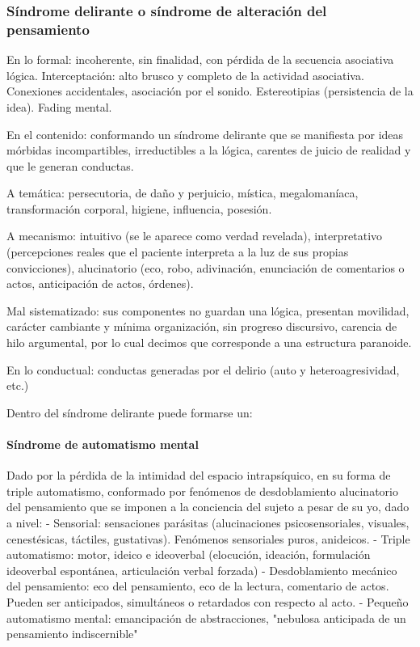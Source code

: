 \subsubsection*{Síndrome delirante o síndrome de alteración del pensamiento}
En lo formal: incoherente, sin finalidad, con pérdida de la secuencia asociativa lógica. Interceptación: alto brusco y completo de la actividad asociativa. Conexiones accidentales, asociación por el sonido. Estereotipias (persistencia de la idea). Fading mental.

En el contenido: conformando un síndrome delirante que se manifiesta por ideas mórbidas incompartibles, irreductibles a la lógica, carentes de juicio de realidad y que le generan conductas.

A temática: persecutoria, de daño y perjuicio, mística, megalomaníaca, transformación corporal, higiene, influencia, posesión.

A mecanismo: intuitivo (se le aparece como verdad revelada), interpretativo (percepciones reales que el paciente interpreta a la luz de sus propias convicciones), alucinatorio (eco, robo, adivinación, enunciación de comentarios o actos, anticipación de actos, órdenes).

Mal sistematizado: sus componentes no guardan una lógica, presentan movilidad, carácter cambiante y mínima organización, sin progreso discursivo, carencia de hilo argumental, por lo cual decimos que corresponde a una estructura paranoide.

En lo conductual: conductas generadas por el delirio (auto y heteroagresividad, etc.)

Dentro del síndrome delirante puede formarse un:
\paragraph{Síndrome de automatismo mental}
Dado por la pérdida de la intimidad del espacio intrapsíquico, en su forma de triple automatismo, conformado por fenómenos de desdoblamiento alucinatorio del pensamiento que se imponen a la conciencia del sujeto a pesar de su yo, dado a nivel:
- Sensorial: sensaciones parásitas (alucinaciones psicosensoriales, visuales, cenestésicas, táctiles, gustativas). Fenómenos sensoriales puros, anideicos.
- Triple automatismo: motor, ideico e ideoverbal (elocución, ideación, formulación ideoverbal espontánea, articulación verbal forzada)
- Desdoblamiento mecánico del pensamiento: eco del pensamiento, eco de la lectura, comentario de actos. Pueden ser anticipados, simultáneos o retardados con respecto al acto.
- Pequeño automatismo mental: emancipación de abstracciones, "nebulosa anticipada de un pensamiento indiscernible"
